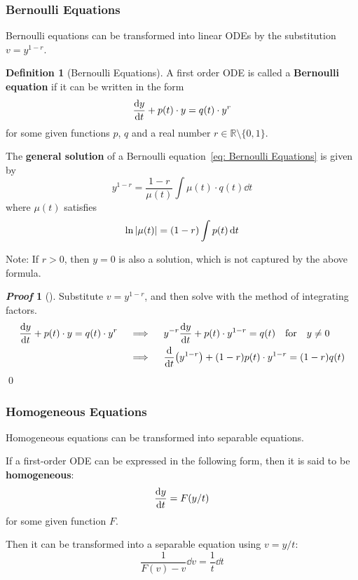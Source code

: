 \documentclass[10pt,UTF8]{article}
\newenvironment{definitionBox}
{
  \begin{tcolorbox}[colback=blue!5!white,colframe=blue!75!black,parbox=false,before
  upper=\par,before lower=\par]}
  {
\end{tcolorbox}}
\newenvironment{theoremBox}
{
  \begin{tcolorbox}[colback=yellow!5!white,colframe=yellow!75!black,parbox=false,before
  upper=\par,before lower=\par]}
  {
\end{tcolorbox}}
\theoremstyle{definition}
\newtheorem{definition inner}{Definition}[section]
\newenvironment{definition}[1][]
{
  \begin{definitionBox}
  \begin{definition inner}[#1]\hfill\par}
    {
    \end{definition inner}
\end{definitionBox}}
\theoremstyle{definition}
\newtheorem{theorem inner}{Theorem}[section]
\theoremstyle{definition}
\newtheorem*{proof inner}{\textit{Proof}}
\renewenvironment{proof}[1][]
{
\begin{proof inner}[#1]\hfill\par}
  {\qed\vphantom{.}
\end{proof inner}}
\theoremstyle{plain}
\newtheorem{tip inner}{Tip}[section]
\theoremstyle{remark}
\begin{document}
\subsubsection{Bernoulli Equations}

Bernoulli equations can be transformed into linear ODEs by the
substitution \(v = y^{1-r}\).


\begin{definition}[Bernoulli Equations]
  A first order ODE is called a \textbf{Bernoulli equation} if it can
  be written in the form
  \begin{equation}
    \dv{y}{t} + p(t)\cdot y = q(t)\cdot y^r
    \label{eq: Bernoulli Equations}
  \end{equation}
  for some given functions \(p\), \(q\) and
  a real number \( r\in\mathbb{R} \setminus \{ 0, 1 \} \).
\end{definition}

\begin{theoremBox}
  The \textbf{general solution} of a Bernoulli equation~\eqref{eq:
  Bernoulli Equations} is given by
  \[
    y^{1-r} = \frac{1-r}{\mu(t)} \int \mu(t)\cdot q(t)\dd{t}
  \]
  where \(\mu(t)\) satisfies
  \[
    \ln\abs{\mu(t)} = (1-r)\int p(t)\dd{t}
  \]

  Note: If \(r > 0\), then \(y = 0\) is also a solution,
  which is not captured by the above formula.
\end{theoremBox}

\begin{proof}
  Substitute \(v = y^{1-r}\), and then solve with the method of
  integrating factors.
  \begin{align*}
    \dv{y}{t} + p(t)\cdot y = q(t)\cdot y^r
    \quad & \implies\quad
    y^{-r}\dv{y}{t} + p(t)\cdot y^{1-r} = q(t)
    \qfor y \neq 0 \\
    \quad & \implies\quad
    \dv{t}( y^{1-r}) + (1-r)p(t)\cdot y^{1-r} = (1-r) q(t)
  \end{align*}
\end{proof}

\subsubsection{Homogeneous Equations}

Homogeneous equations can be transformed into separable equations.

\begin{theoremBox}
  If a first-order ODE can be expressed in the following form, then
  it is said to be \textbf{homogeneous}:
  \[
    \dv{y}{t} = F(y/t)
  \]
  for some given function \(F\).

  \noindent
  Then it can be transformed into a separable equation using \(v = y/t\):
  \[
    \frac{1}{F(v) - v} \dd{v} = \frac{1}{t} \dd{t}
  \]
\end{theoremBox}
\end{document}
